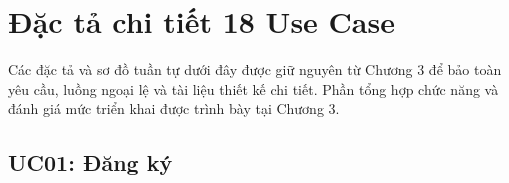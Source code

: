 \chapter{Đặc tả chi tiết 18 Use Case}\label{appendix:usecases}
\vspace{-40pt}
Các đặc tả và sơ đồ tuần tự dưới đây được giữ nguyên từ Chương 3 để bảo toàn yêu cầu, luồng ngoại lệ và tài liệu thiết kế chi tiết. Phần tổng hợp chức năng và đánh giá mức triển khai được trình bày tại Chương 3.

\section{UC01: Đăng ký}
\begin{usecasetable}

    \caption{Đặc tả UC01: Đăng ký}\label{tab:uc-01}\\ \hline


\end{usecasetable}
